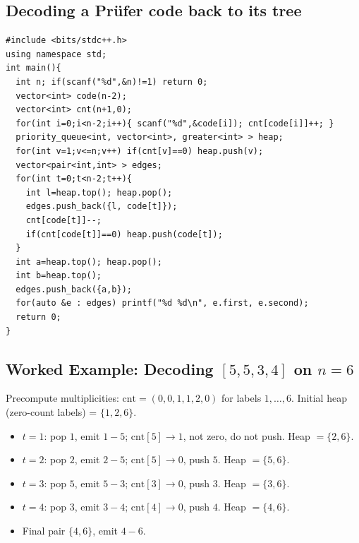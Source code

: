 \subsection{Decoding a Pr\"ufer code back to its tree}

\begin{lstlisting}[caption={Pruefer decode. Precompute count of each label in the code; use a min-heap of zero-count vertices as the candidate leaves; at each step emit edge smallest-leaf to code at t, decrement count of code at t, and push code at t into the heap if it just hit zero. After n-2 steps, two labels remain, emit their edge. ASCII only, identifiers without underscores}, label={lst:c32-decode}]
#include <bits/stdc++.h>
using namespace std;
int main(){
  int n; if(scanf("%d",&n)!=1) return 0;
  vector<int> code(n-2);
  vector<int> cnt(n+1,0);
  for(int i=0;i<n-2;i++){ scanf("%d",&code[i]); cnt[code[i]]++; }
  priority_queue<int, vector<int>, greater<int> > heap;
  for(int v=1;v<=n;v++) if(cnt[v]==0) heap.push(v);
  vector<pair<int,int> > edges;
  for(int t=0;t<n-2;t++){
    int l=heap.top(); heap.pop();
    edges.push_back({l, code[t]});
    cnt[code[t]]--;
    if(cnt[code[t]]==0) heap.push(code[t]);
  }
  int a=heap.top(); heap.pop();
  int b=heap.top();
  edges.push_back({a,b});
  for(auto &e : edges) printf("%d %d\n", e.first, e.second);
  return 0;
}
\end{lstlisting}

\subsection*{Worked Example: Decoding \([5,5,3,4]\) on \(n=6\)}

Precompute multiplicities: \(\mathrm{cnt} = (0,0,1,1,2,0)\) for labels
\(1,\dots,6\).  Initial heap (zero-count labels) = \(\{1,2,6\}\).

\begin{itemize}[nosep]
  \item \(t=1\): pop \(1\), emit \(1\!-\!5\); \(\mathrm{cnt}[5]\to 1\), not
        zero, do not push.  Heap \(=\{2,6\}\).
  \item \(t=2\): pop \(2\), emit \(2\!-\!5\); \(\mathrm{cnt}[5]\to 0\),
        push \(5\).  Heap \(=\{5,6\}\).
  \item \(t=3\): pop \(5\), emit \(5\!-\!3\); \(\mathrm{cnt}[3]\to 0\),
        push \(3\).  Heap \(=\{3,6\}\).
  \item \(t=4\): pop \(3\), emit \(3\!-\!4\); \(\mathrm{cnt}[4]\to 0\),
        push \(4\).  Heap \(=\{4,6\}\).
  \item Final pair \(\{4,6\}\), emit \(4\!-\!6\).
\end{itemize}

